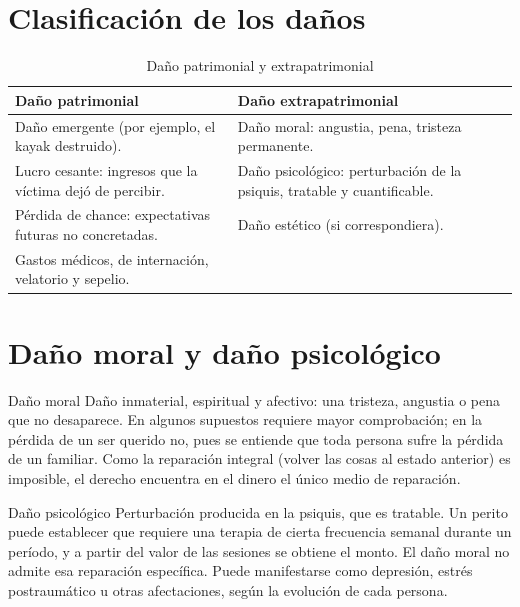 \documentclass[12pt,oneside]{book}
\begin{document}
\section{Clasificación de los daños}

\begin{table}[H]
\centering
\caption{Daño patrimonial y extrapatrimonial}
\begin{tabularx}{\textwidth}{X X}
\toprule
\textbf{Daño patrimonial} & \textbf{Daño extrapatrimonial} \\
\midrule
Daño emergente (por ejemplo, el kayak destruido). & Daño moral: angustia, pena, tristeza permanente. \\
Lucro cesante: ingresos que la víctima dejó de percibir. & Daño psicológico: perturbación de la psiquis, tratable y cuantificable. \\
Pérdida de chance: expectativas futuras no concretadas. & Daño estético (si correspondiera). \\
Gastos médicos, de internación, velatorio y sepelio. & \\
\bottomrule
\end{tabularx}
\end{table}

\section{Daño moral y daño psicológico}

\begin{definicion}{Daño moral}
Daño inmaterial, espiritual y afectivo: una tristeza, angustia o pena que no desaparece. En algunos supuestos requiere mayor comprobación; en la pérdida de un ser querido no, pues se entiende que toda persona sufre la pérdida de un familiar. Como la reparación integral (volver las cosas al estado anterior) es imposible, el derecho encuentra en el dinero el único medio de reparación.
\end{definicion}

\begin{definicion}{Daño psicológico}
Perturbación producida en la psiquis, que es tratable. Un perito puede establecer que requiere una terapia de cierta frecuencia semanal durante un período, y a partir del valor de las sesiones se obtiene el monto. El daño moral no admite esa reparación específica. Puede manifestarse como depresión, estrés postraumático u otras afectaciones, según la evolución de cada persona.
\end{definicion}
\end{document}
